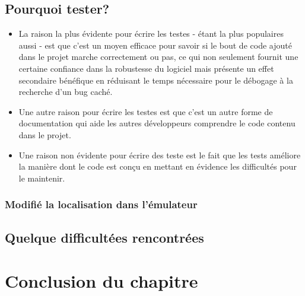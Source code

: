 \subsection[Pourquoi tester?]{Pourquoi tester? ~\cite{pycon:getting_started_with_automated_testing}}

\begin{itemize}
\item La raison la plus évidente pour écrire les testes - étant la plus populaires aussi - est que c'est un moyen efficace pour savoir si le bout de code ajouté dans le projet marche correctement ou pas, ce qui non seulement fournit une certaine confiance dans la robustesse du logiciel mais présente un effet secondaire bénéfique en réduisant le temps nécessaire pour le débogage à la recherche d'un bug caché. %
\item Une autre raison pour écrire les testes est que c'est un autre forme de documentation qui aide les autres développeurs comprendre le code contenu dans le projet.
\item Une raison non évidente pour écrire des teste est le fait que les tests améliore la manière dont le code est conçu en mettant en évidence les difficultés pour le maintenir.
\end{itemize}
\subsubsection{Modifié la localisation dans l'émulateur}%

\subsection{Quelque difficultées rencontrées}

\section{Conclusion du chapitre}